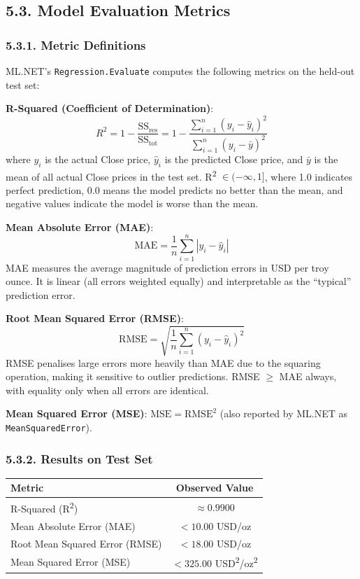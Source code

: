 \subsection{5.3. Model Evaluation Metrics}

\subsubsection{5.3.1. Metric Definitions}
ML.NET's \texttt{Regression.Evaluate} computes the following metrics on the held-out test set:

\textbf{R-Squared (Coefficient of Determination)}:
\[
R^2 = 1 - \frac{\text{SS}_{\text{res}}}{\text{SS}_{\text{tot}}} = 1 - \frac{\sum_{i=1}^{n}(y_i - \hat{y}_i)^2}{\sum_{i=1}^{n}(y_i - \bar{y})^2}
\]
where $y_i$ is the actual Close price, $\hat{y}_i$ is the predicted Close price, and $\bar{y}$ is the mean of all actual Close prices in the test set. R\textsuperscript{2} $\in (-\infty, 1]$, where 1.0 indicates perfect prediction, 0.0 means the model predicts no better than the mean, and negative values indicate the model is worse than the mean.

\textbf{Mean Absolute Error (MAE)}:
\[
\text{MAE} = \frac{1}{n}\sum_{i=1}^{n} |y_i - \hat{y}_i|
\]
MAE measures the average magnitude of prediction errors in USD per troy ounce. It is linear (all errors weighted equally) and interpretable as the ``typical'' prediction error.

\textbf{Root Mean Squared Error (RMSE)}:
\[
\text{RMSE} = \sqrt{\frac{1}{n}\sum_{i=1}^{n}(y_i - \hat{y}_i)^2}
\]
RMSE penalises large errors more heavily than MAE due to the squaring operation, making it sensitive to outlier predictions. RMSE $\geq$ MAE always, with equality only when all errors are identical.

\textbf{Mean Squared Error (MSE)}: $\text{MSE} = \text{RMSE}^2$ (also reported by ML.NET as \texttt{MeanSquaredError}).

\subsubsection{5.3.2. Results on Test Set}

\begin{center}
\begin{tabular}{|l|c|}
\hline
\textbf{Metric} & \textbf{Observed Value}\\
\hline
R-Squared (R\textsuperscript{2}) & $\approx 0.9900$\\
Mean Absolute Error (MAE) & $< 10.00$ USD/oz\\
Root Mean Squared Error (RMSE) & $< 18.00$ USD/oz\\
Mean Squared Error (MSE) & $< 325.00$ USD\textsuperscript{2}/oz\textsuperscript{2}\\
\hline
\end{tabular}
\end{center}

